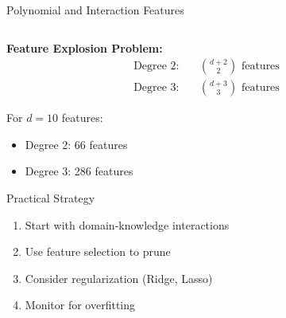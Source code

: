 \documentclass[aspectratio=169,11pt]{beamer}
\begin{document}
\begin{frame}[fragile]{Polynomial and Interaction Features}
\begin{columns}
\begin{column}{0.5\textwidth}
\vspace{0.3cm}
\textbf{Feature Explosion Problem:}
\begin{align}
\text{Degree 2:} \quad &\binom{d+2}{2} \text{ features}\\
\text{Degree 3:} \quad &\binom{d+3}{3} \text{ features}
\end{align}

For $d=10$ features:
\begin{itemize}
\item Degree 2: 66 features
\item Degree 3: 286 features
\end{itemize}

\begin{block}{Practical Strategy}
\begin{enumerate}
\item Start with domain-knowledge interactions
\item Use feature selection to prune
\item Consider regularization (Ridge, Lasso)
\item Monitor for overfitting
\end{enumerate}
\end{block}
\end{column}
\end{columns}
\end{frame}
\end{document}
